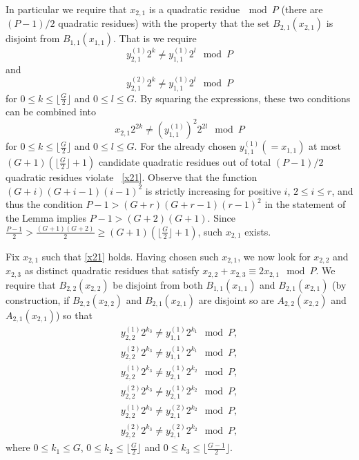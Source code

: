 In particular we require that $x_{2,1}$ is a quadratic residue$~\mod
P$ (there are $(P-1)/2$ quadratic residues) with the property that
the set $B_{2,1}(x_{2,1})$ is disjoint from $B_{1,1}(x_{1,1})$. That
is we require \[y_{2,1}^{(1)}2^k \neq y_{1,1}^{(1)} 2^l \mod P \]
and
\[y_{2,1}^{(2)}2^k \neq y_{1,1}^{(1)} 2^l \mod P \] for $0 \leq k \leq \lfloor
\frac{G}{2} \rfloor$ and $0 \leq l \leq G$. By squaring the
expressions, these two conditions can be combined into
\begin{equation}\label{x21}x_{2,1}2^{2k} \neq (y_{1,1}^{(1)})^2 2^{2l} \mod P \end{equation}for $0
\leq k \leq \lfloor \frac{G}{2} \rfloor$ and $0 \leq l \leq G$. For
the already chosen $y_{1,1}^{(1)}(=x_{1,1})$ at most $(G+1)(\lfloor
\frac{G}{2} \rfloor+1)$ candidate quadratic residues out of total
$(P-1)/2$ quadratic residues violate ~\eqref{x21}. Observe that the
function $(G+i)(G+i-1)(i-1)^2$ is strictly increasing for positive
$i$, $2 \leq i \leq r$, and thus the condition $P-1>
(G+r)(G+r-1)(r-1)^2$ in the statement of the Lemma implies
$P-1>(G+2)(G+1)$. Since $\frac{P-1}{2} > \frac{(G+1)(G+2)}{2} \geq
(G+1)(\lfloor \frac{G}{2} \rfloor+1)$, such $x_{2,1}$ exists.

Fix $x_{2,1}$ such that \eqref{x21} holds. Having chosen such
$x_{2,1}$, we now look for $x_{2,2}$ and $x_{2,3}$ as distinct
quadratic residues that satisfy $x_{2,2}+x_{2,3} \equiv 2x_{2,1}
\mod P$. We require that $B_{2,2}(x_{2,2})$ be disjoint from both
$B_{1,1}(x_{1,1})$ and $B_{2,1}(x_{2,1})$ (by construction, if
$B_{2,2}(x_{2,2})$ and $B_{2,1}(x_{2,1})$ are disjoint so are
$A_{2,2}(x_{2,2})$ and $A_{2,1}(x_{2,1})$) so that
\begin{equation}\label{eqx22pre}\begin{array}{ccc}
y_{2,2}^{(1)}2^{k_3} \neq y_{1,1}^{(1)} 2^{k_1} \mod P, \\
y_{2,2}^{(2)}2^{k_3} \neq y_{1,1}^{(1)} 2^{k_1} \mod P,  \\
y_{2,2}^{(1)}2^{k_3} \neq y_{2,1}^{(1)} 2^{k_2} \mod P, \\
y_{2,2}^{(2)}2^{k_3} \neq y_{2,1}^{(1)} 2^{k_2} \mod P,  \\
y_{2,2}^{(1)}2^{k_3} \neq y_{2,1}^{(2)} 2^{k_2} \mod P, \\
y_{2,2}^{(2)}2^{k_3} \neq y_{2,1}^{(2)} 2^{k_2} \mod P,
\end{array}\end{equation}
where $0 \leq k_1 \leq G$, $0 \leq k_2 \leq \lfloor \frac{G}{2}
\rfloor$ and $0 \leq k_3 \leq \lfloor\frac{G-1}{2} \rfloor$.

